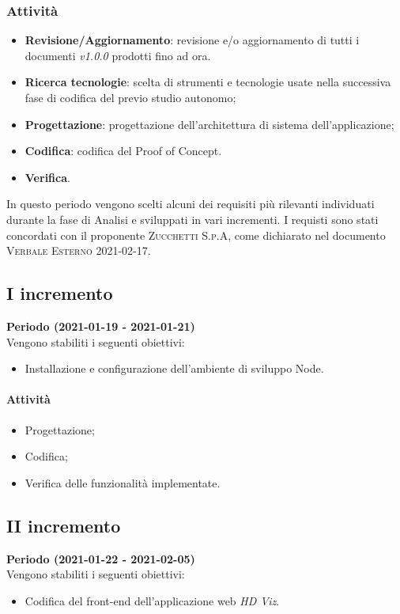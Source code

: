 \documentclass[../piano_di_progetto.tex]{subfiles}
\begin{document}
\subsubsection*{Attività}
\begin{itemize}
    \item \textbf{Revisione/Aggiornamento}: revisione e/o aggiornamento di tutti i documenti \emph{v1.0.0} prodotti fino ad ora.
    \item \textbf{Ricerca tecnologie}: scelta di strumenti e tecnologie usate nella successiva fase di codifica del  previo studio autonomo;
    \item \textbf{Progettazione}: progettazione dell'architettura di sistema dell'applicazione;
    \item \textbf{Codifica}: codifica del Proof of Concept. 
    \item \textbf{Verifica}.\\
\end{itemize}
In questo periodo vengono scelti alcuni dei requisiti più rilevanti individuati durante la fase di Analisi e sviluppati in vari incrementi.
I requisti sono stati concordati con il proponente \textsc{Zucchetti S.p.A}, come dichiarato nel documento \textsc{Verbale Esterno 2021-02-17}.%

\subsection*{I incremento}
\textbf{Periodo (2021-01-19 - 2021-01-21)}\\
Vengono stabiliti i seguenti obiettivi:
\begin{itemize}
    \item Installazione e configurazione dell'ambiente di sviluppo Node.
\end{itemize}
\paragraph*{Attività}
\begin{itemize}
    \item Progettazione;
    \item Codifica;
    \item Verifica delle funzionalità implementate.
\end{itemize}

\subsection*{II incremento}
\textbf{Periodo (2021-01-22 - 2021-02-05)} \\
Vengono stabiliti i seguenti obiettivi:
\begin{itemize}
    \item Codifica del front-end dell'applicazione web \emph{HD Viz}.
\end{itemize}
\end{document}
